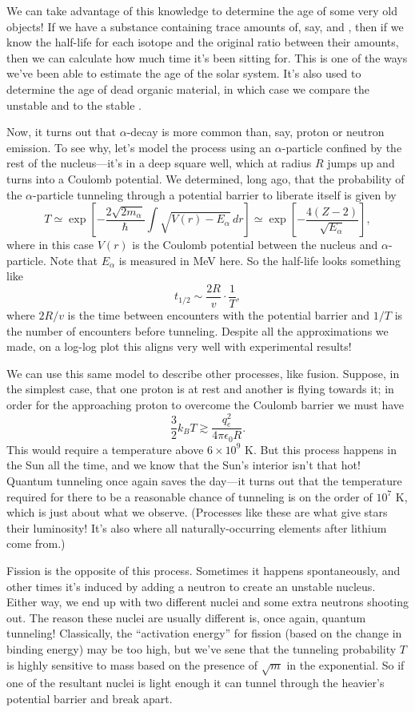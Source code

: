 \documentclass[../p052main.tex]{subfiles}
\begin{document}
We can take advantage of this knowledge to determine the age of some very old objects!
If we have a substance containing trace amounts of, say,  and , then if we know the half-life for each isotope and the original ratio between their amounts, then we can calculate how much time it's been sitting for.
This is one of the ways we've been able to estimate the age of the solar system.
It's also used to determine the age of dead organic material, in which case we compare the unstable  and  to the stable .

Now, it turns out that $\alpha$-decay is more common than, say, proton or neutron emission.
To see why, let's model the process using an $\alpha$-particle confined by the rest of the nucleus---it's in a deep square well, which at radius $R$ jumps up and turns into a Coulomb potential.
We determined, long ago, that the probability of the $\alpha$-particle tunneling through a potential barrier to liberate itself is given by
\[ T \simeq \exp \left[ -\frac{2 \sqrt{2m_\alpha}}{\hbar} \int \sqrt{V(r) - E_\alpha} \,dr \right] \simeq \exp \left[ -\frac{4(Z-2)}{\sqrt{E_\alpha}} \right], \]
where in this case $V(r)$ is the Coulomb potential between the nucleus and $\alpha$-particle.
Note that $E_\alpha$ is measured in MeV here.
So the half-life looks something like
\[ t_{1 / 2} \sim \frac{2R}{v} \cdot \frac{1}{T}, \]
where $2R / v$ is the time between encounters with the potential barrier and $1 / T$ is the number of encounters before tunneling.
Despite all the approximations we made, on a log-log plot this aligns very well with experimental results!

We can use this same model to describe other processes, like fusion.
Suppose, in the simplest case, that one proton is at rest and another is flying towards it; in order for the approaching proton to overcome the Coulomb barrier we must have
\[ \frac{3}{2} k_BT \gtrsim \frac{q_e^2}{4\pi \epsilon_0 R}. \]
This would require a temperature above $6 \times 10^{9} \textrm { K}$.
But this process happens in the Sun all the time, and we know that the Sun's interior isn't that hot!
Quantum tunneling once again saves the day---it turns out that the temperature required for there to be a reasonable chance of tunneling is on the order of $10^{7} \textrm{ K}$, which is just about what we observe.
(Processes like these are what give stars their luminosity!
It's also where all naturally-occurring elements after lithium come from.)

Fission is the opposite of this process.
Sometimes it happens spontaneously, and other times it's induced by adding a neutron to create an unstable nucleus.
Either way, we end up with two different nuclei and some extra neutrons shooting out.
The reason these nuclei are usually different is, once again, quantum tunneling!
Classically, the ``activation energy'' for fission (based on the change in binding energy) may be too high, but we've sene that the tunneling probability $T$ is highly sensitive to mass based on the presence of $\sqrt{m}$ in the exponential.
So if one of the resultant nuclei is light enough it can tunnel through the heavier's potential barrier and break apart.
\end{document}
